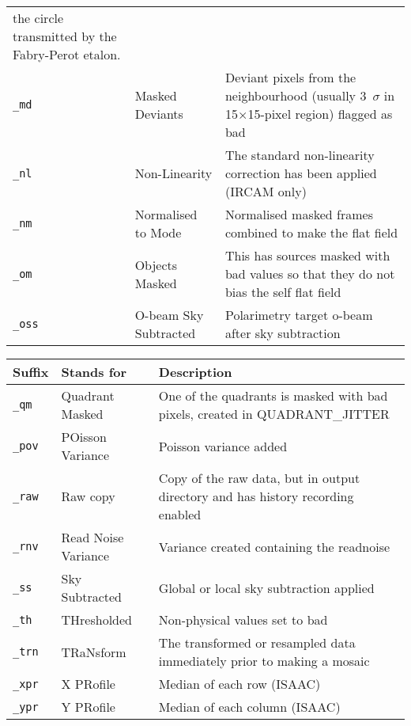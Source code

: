 \documentclass[twoside,11pt,nolof]{starlink}
\begin{document}
\begin{tabular}{llp{81mm}}
                                 the circle transmitted by the Fabry-Perot etalon. \\
{\tt\_md}  & Masked Deviants   & Deviant pixels from the neighbourhood (usually
                                 3~$\sigma$ in 15$\times$15-pixel region) flagged as bad \\
{\tt\_nl}  & Non-Linearity     & The standard non-linearity correction has
                                 been applied (IRCAM only) \\
{\tt\_nm}  & Normalised to Mode & Normalised masked frames combined to make
                                 the flat field \\
{\tt\_om } & Objects Masked    & This has sources masked with bad values
                                 so that they do not bias the self flat field \\
{\tt\_oss} & O-beam Sky Subtracted & Polarimetry target o-beam after sky subtraction \\
\end{tabular}

\begin{tabular}{llp{90mm}}
\hline
  Suffix   & Stands for        & Description \\ \hline
{\tt\_qm}  & Quadrant Masked   & One of the quadrants is masked with bad
                                 pixels, created in QUADRANT\_JITTER \\
{\tt\_pov} & POisson Variance  & Poisson variance added \\
{\tt\_raw} & Raw copy          & Copy of the raw data, but in output directory
                                 and has history recording enabled \\
{\tt\_rnv} & Read Noise Variance & Variance created containing the readnoise \\
{\tt\_ss}  & Sky Subtracted    & Global or local sky subtraction applied \\
{\tt\_th}  & THresholded       & Non-physical values set to bad \\
{\tt\_trn} & TRaNsform         & The transformed or resampled data immediately
                                 prior to making a mosaic \\
{\tt\_xpr} & X PRofile         & Median of each row (ISAAC) \\
{\tt\_ypr} & Y PRofile         & Median of each column (ISAAC) \\
\end{tabular}
\end{document}
